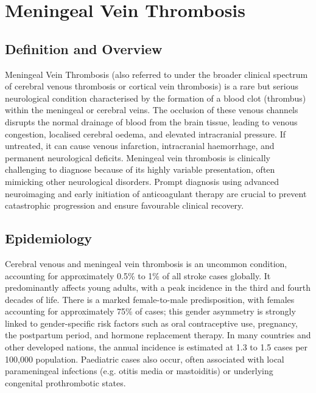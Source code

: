 \chapter{Meningeal Vein Thrombosis}

\section*{Definition and Overview}
Meningeal Vein Thrombosis (also referred to under the broader clinical spectrum of cerebral venous thrombosis or cortical vein thrombosis) is a rare but serious neurological condition characterised by the formation of a blood clot (thrombus) within the meningeal or cerebral veins. The occlusion of these venous channels disrupts the normal drainage of blood from the brain tissue, leading to venous congestion, localised cerebral oedema, and elevated intracranial pressure. If untreated, it can cause venous infarction, intracranial haemorrhage, and permanent neurological deficits. Meningeal vein thrombosis is clinically challenging to diagnose because of its highly variable presentation, often mimicking other neurological disorders. Prompt diagnosis using advanced neuroimaging and early initiation of anticoagulant therapy are crucial to prevent catastrophic progression and ensure favourable clinical recovery.

\section*{Epidemiology}
Cerebral venous and meningeal vein thrombosis is an uncommon condition, accounting for approximately 0.5\% to 1\% of all stroke cases globally. It predominantly affects young adults, with a peak incidence in the third and fourth decades of life. There is a marked female-to-male predisposition, with females accounting for approximately 75\% of cases; this gender asymmetry is strongly linked to gender-specific risk factors such as oral contraceptive use, pregnancy, the postpartum period, and hormone replacement therapy. In many countries and other developed nations, the annual incidence is estimated at 1.3 to 1.5 cases per 100,000 population. Paediatric cases also occur, often associated with local parameningeal infections (e.g. otitis media or mastoiditis) or underlying congenital prothrombotic states.

